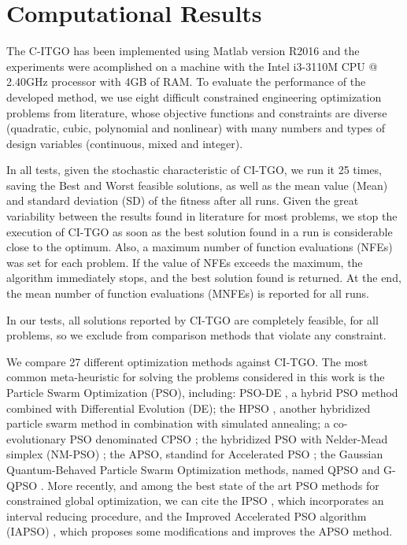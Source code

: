 \section{Computational Results} \label{sec:Results}

The C-ITGO has been implemented using Matlab version R2016 and the experiments were acomplished on a machine with the Intel i3-3110M CPU @ 2.40GHz processor with 4GB of RAM. To evaluate the performance of the developed method, we use eight difficult constrained engineering optimization problems from literature, whose objective functions and constraints are diverse (quadratic, cubic, polynomial and nonlinear) with many numbers and types of design variables (continuous, mixed and integer). 

In all tests, given the stochastic characteristic of CI-TGO, we run it 25 times, saving the Best and Worst feasible solutions, as well as the mean value (Mean) and standard deviation (SD) of the fitness after all runs. Given the great variability between the results found in literature for most problems, we stop the execution of CI-TGO as soon as the best solution found in a run is considerable close to the optimum. Also, a maximum number of function evaluations (NFEs) was set for each problem. If the value of NFEs exceeds the maximum, the algorithm immediately stops, and the best solution found is returned. At the end, the mean number of function evaluations (MNFEs) is reported for all runs.

In our tests, all solutions reported by CI-TGO are completely feasible, for all problems, so we exclude from comparison methods that violate any constraint.

We compare 27 different optimization methods against CI-TGO. The most common meta-heuristic for solving the problems considered in this work is the Particle Swarm Optimization (PSO), including: PSO-DE \citep{PSO-DE}, a hybrid PSO method combined with Differential Evolution (DE); the HPSO \citep{HPSO}, another hybridized particle swarm method in combination with simulated annealing; a co-evolutionary PSO denominated CPSO \citep{CPSO}; the hybridized PSO with Nelder-Mead simplex (NM-PSO) \citep{NM-PSO}; the APSO, standind for Accelerated PSO  \citep{APSO}; the Gaussian Quantum-Behaved Particle Swarm Optimization methods, named QPSO and G-QPSO \citep{QPSO}. More recently, and among the best state of the art PSO methods for constrained global optimization, we can cite the IPSO \citep{IPSO}, which incorporates an interval reducing procedure, and the Improved Accelerated PSO algorithm (IAPSO) \citep{IAPSO}, which proposes some modifications and improves the APSO method.

